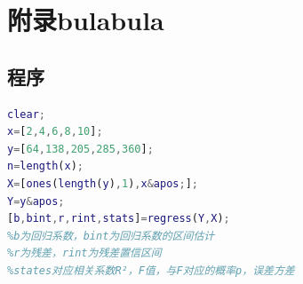 \documentclass[UTF8,12pt,a4paper]{article}
\begin{document}
\begin{thebibliography}{2}
\end{thebibliography}


\appendix
\renewcommand{\appendixname}{Appendix~\Alph{section}}

\section{附录bulabula}
\subsection{程序}
\begin{lstlisting}[language={Matlab},morekeywords={regress}]
clear;
x=[2,4,6,8,10];
y=[64,138,205,285,360];
n=length(x);
X=[ones(length(y),1),x&apos;];
Y=y&apos;
[b,bint,r,rint,stats]=regress(Y,X);
%b为回归系数，bint为回归系数的区间估计
%r为残差，rint为残差置信区间
%states对应相关系数R²，F值，与F对应的概率p，误差方差
\end{lstlisting}
\end{document}
